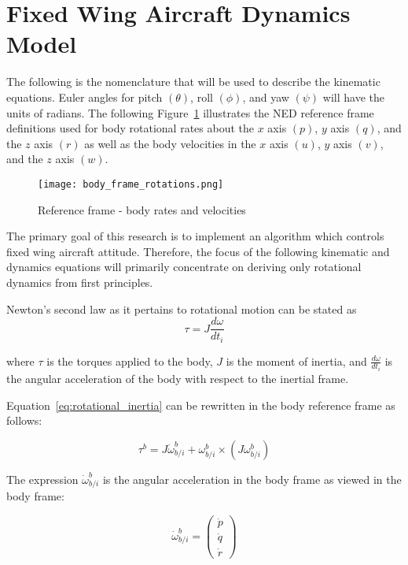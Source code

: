 \label{appendix:dynamics_model}
\section{Fixed Wing Aircraft Dynamics Model}

The following is the nomenclature that will be used to describe the kinematic equations.  Euler angles for pitch $(\theta)$, roll $(\phi)$, and yaw $(\psi)$ will have the units of radians.  The following Figure~\ref{fig:reference_frame} illustrates the \ac{NED} reference frame definitions used for body rotational rates about the $x$ axis $(p)$, $y$ axis $(q)$, and the $z$ axis $(r)$ as well as the body velocities in the $x$ axis $(u)$, $y$ axis $(v)$, and the $z$ axis $(w)$.

\begin{figure}[h!]
 \centering
  \texttt{[image: body\_frame\_rotations.png]}
  \caption{Reference frame - body rates and velocities}
  \label{fig:reference_frame}
\end{figure}

The primary goal of this research is to implement an algorithm which controls fixed wing aircraft attitude.  Therefore, the focus of the following kinematic and dynamics equations will primarily concentrate on deriving only rotational dynamics from first principles.  

Newton's second law as it pertains to rotational motion can be stated as
\begin{equation}\label{eq:rotational_inertia}
\tau=J\frac{d\omega}{dt_i}
\end{equation}

where $\tau$ is the torques applied to the body, $J$ is the moment of inertia, and $ \frac{d\omega}{dt_i}$ is the angular acceleration of the body with respect to the inertial frame.

Equation~\ref{eq:rotational_inertia} can be rewritten in the body reference frame as follows:

\begin{equation}
\tau^b=J\dot{\omega}_{b/i}^b+\omega_{b/i}^b\times\left(J\omega_{b/i}^b\right)
\end{equation}

The expression $\dot{\omega}_{b/i}^b$ is the angular acceleration in the body frame as viewed in the body frame:

\begin{equation}
\dot{\omega}_{b/i}^b=
\begin{pmatrix}
\dot{p}\\
\dot{q}\\
\dot{r}
\end{pmatrix}
\end{equation}

